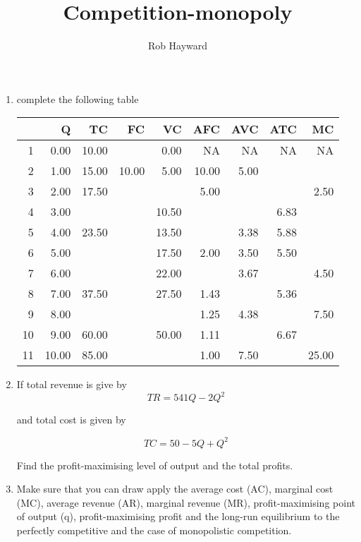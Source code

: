 \documentclass[12pt, a4paper, oneside]{article}\usepackage[]{graphicx}\usepackage[]{color}
\author{Rob Hayward}
\begin{document}
\title{Competition-monopoly}
\maketitle

\begin{enumerate}
\item complete the following table

\begin{table}[ht]
\centering
\begin{tabular}{rrrrrrrrr}
  \hline
 & Q & TC & FC & VC & AFC & AVC & ATC & MC \\ 
  \hline
  1 & 0.00 & 10.00 &       & 0.00 & NA & NA & NA &  NA\\ 
  2 & 1.00 & 15.00 & 10.00 & 5.00 & 10.00 & 5.00 &  &  \\ 
  3 & 2.00 & 17.50 &       &      & 5.00 &    &  & 2.50 \\ 
  4 & 3.00 &       &       & 10.50 &     &   & 6.83 &  \\ 
  5 & 4.00 & 23.50 &       & 13.50 &     & 3.38 & 5.88 &  \\ 
  6 & 5.00 &       &       & 17.50 & 2.00 & 3.50 & 5.50 &  \\ 
  7 & 6.00 &    &       & 22.00 &     & 3.67 &  & 4.50 \\ 
  8 & 7.00 & 37.50 &       & 27.50 & 1.43 &  & 5.36 &  \\ 
  9 & 8.00 &       &       &       & 1.25 & 4.38 &  & 7.50 \\ 
10 & 9.00 & 60.00 &      & 50.00 & 1.11 &  & 6.67 &  \\ 
11 & 10.00 & 85.00 &     &       & 1.00 & 7.50 &  & 25.00 \\ 
   \hline
\end{tabular}
\end{table}




\item If total revenue is give by 
\begin{equation*}
TR = 541Q - 2Q^2
\end{equation*}

and total cost is given by 

\begin{equation*}
TC = 50 - 5Q + Q^2
\end{equation*}

Find the profit-maximising level of output and the total profits. 

\item Make sure that you can draw apply the average cost (AC), marginal cost (MC), average revenue (AR), marginal revenue (MR), profit-maximising point of output (q), profit-maximising profit and the long-run equilibrium to the  perfectly competitive and the case of monopolistic competition. 

\end{enumerate}
\end{document}
